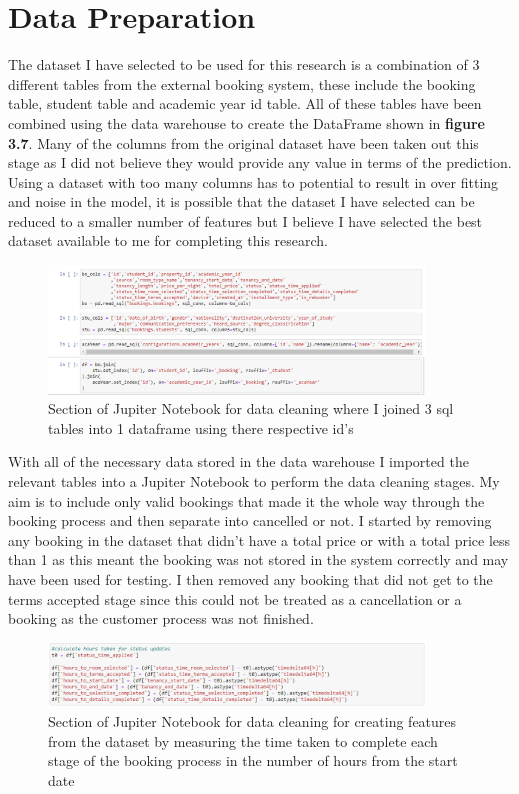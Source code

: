 \section{Data Preparation}

The dataset I have selected to be used for this research is a combination of 3 different tables from the external booking system, these include the booking table, student table and academic year id table. All of these tables have been combined using the data warehouse to create the DataFrame shown in \textbf{figure 3.7}. Many of the columns from the original dataset have been taken out this stage as I did not believe they would provide any value in terms of the prediction. Using a dataset with too many columns has to potential to result in over fitting and noise in the model, it is possible that the dataset I have selected can be reduced to a smaller number of features but I believe I have selected the best dataset available to me for completing this research. 

\begin{figure}[hbt!]
 \includegraphics[width=10cm]{figures/joining_tables.png}
 \caption{Section of Jupiter Notebook for data cleaning where I joined 3 sql tables into 1 dataframe using there respective id's}
\end{figure}

With all of the necessary data stored in the data warehouse I imported the relevant tables into a Jupiter Notebook to perform the data cleaning stages. My aim is to include only valid bookings that made it the whole way through the booking process and then separate into cancelled or not. I started by removing any booking in the dataset that didn't have a total price or with a total price less than 1 as this meant the booking was not stored in the system correctly and may have been used for testing. I then removed any booking that did not get to the terms accepted stage since this could not be treated as a cancellation or a booking as the customer process was not finished.

\begin{figure}[hbt!]
 \includegraphics[width=10cm]{figures/time_variables.png}
 \caption{Section of Jupiter Notebook for data cleaning for creating features from the dataset by measuring the time taken to complete each stage of the booking process in the number of hours from the start date}
\end{figure}


